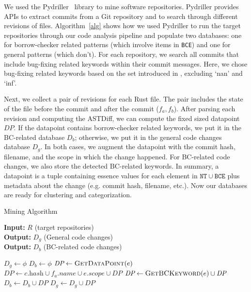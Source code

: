 We used the Pydriller~\citep{spadini2018pydriller} library to mine software repositories. Pydriller provides APIs to extract commits from a Git repository and to search through different revisions of files. Algorithm~\ref{alg} shows how we used Pydriller to run the target repositories through our code analysis pipeline and populate two databases: one for borrow-checker related patterns (which involve items in \texttt{BCE}) and one for general patterns (which don't). For each repository, we search all commits that include bug-fixing related keywords within their commit messages. Here, we chose bug-fixing related keywords based on the set introduced in \cite{zhang2018empirical}, excluding `nan' and `inf'. 


Next, we collect a pair of revisions for each Rust file. The pair includes the state of the file before the commit and after the commit ($f_a, f_b$). After parsing each revision and computing the ASTDiff, we can compute the fixed sized datapoint $\mathit{DP}$. If the datapoint contains borrow-checker related keywords, we put it in the BC-related database $D_b$; otherwise, we put it in the general code changes database $D_g$. In both cases, we augment the datapoint with the commit hash, filename, and the scope in which the change happened. For BC-related code changes, we also store the detected BC-related keywords. In summary, a datapoint is a tuple containing essence values for each element in $\mathtt{NT} \cup \mathtt{BCE}$ plus metadata about the change (e.g. commit hash, filename, etc.). Now our databases are ready for clustering and categorization.

\begin{algorithm}
\caption{\label{alg} Mining Algorithm}
\hspace*{2mm} \textbf{Input:} $R$ (target repositories)  \\
\hspace*{2mm} \textbf{Output:} $D_g$ (General code changes) \\
\hspace*{2mm} \textbf{Output:} $D_b$ (BC-related code changes)
\begin{algorithmic}
\State $D_g \leftarrow \phi$
\State $D_b \leftarrow \phi$
                    \State $\textit{DP} \leftarrow \textsc{GetDataPoint}(e)$
                    \State $\textit{DP} \leftarrow c.\textit{hash} \cup f_a.\textit{name} \cup e.\textit{scope} \cup \textit{DP} $
                        \State $\textit{DP} \leftarrow \textsc{GetBCKeyword}(e) \cup \textit{DP} $
                        \State $D_b \leftarrow D_b \cup \textit{DP}$
                    \Else
                        \State $D_g \leftarrow D_g \cup \textit{DP}$
                    \EndIf
                \EndFor
            \EndFor
        \EndIf
    \EndFor
\EndFor
\end{algorithmic}
\end{algorithm}


